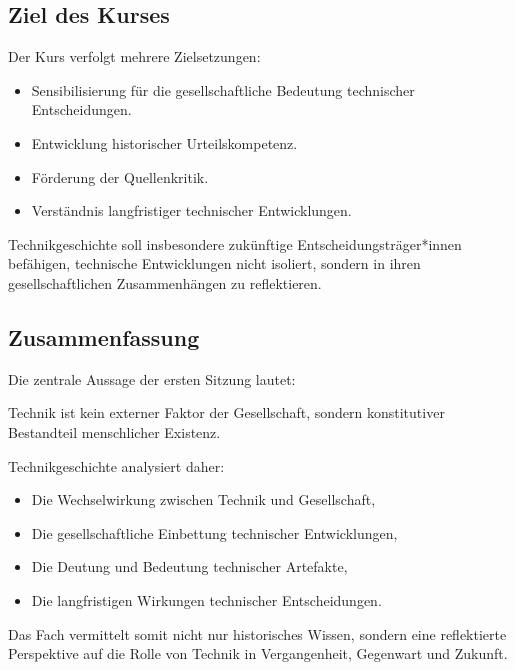 \subsection{Ziel des Kurses}

Der Kurs verfolgt mehrere Zielsetzungen:

\begin{itemize}
    \item Sensibilisierung für die gesellschaftliche Bedeutung technischer Entscheidungen.
    \item Entwicklung historischer Urteilskompetenz.
    \item Förderung der Quellenkritik.
    \item Verständnis langfristiger technischer Entwicklungen.
\end{itemize}

Technikgeschichte soll insbesondere zukünftige Entscheidungsträger*innen 
befähigen, technische Entwicklungen nicht isoliert, sondern in ihren 
gesellschaftlichen Zusammenhängen zu reflektieren.

\subsection{Zusammenfassung}

Die zentrale Aussage der ersten Sitzung lautet:

Technik ist kein externer Faktor der Gesellschaft, sondern konstitutiver Bestandteil 
menschlicher Existenz. 

Technikgeschichte analysiert daher:

\begin{itemize}
    \item Die Wechselwirkung zwischen Technik und Gesellschaft,
    \item Die gesellschaftliche Einbettung technischer Entwicklungen,
    \item Die Deutung und Bedeutung technischer Artefakte,
    \item Die langfristigen Wirkungen technischer Entscheidungen.
\end{itemize}

Das Fach vermittelt somit nicht nur historisches Wissen, sondern 
eine reflektierte Perspektive auf die Rolle von Technik in Vergangenheit, 
Gegenwart und Zukunft.